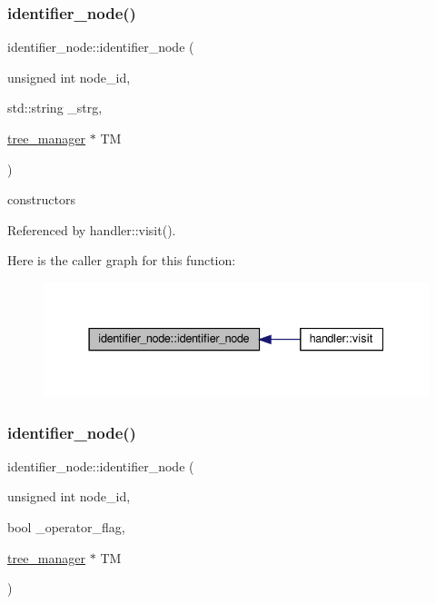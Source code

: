 \subsubsection{\texorpdfstring{identifier\+\_\+node()}{identifier\_node()}\hspace{0.1cm}{\footnotesize\ttfamily [1/2]}}
{\footnotesize\ttfamily identifier\+\_\+node\+::identifier\+\_\+node (\begin{DoxyParamCaption}\item[{unsigned int}]{node\+\_\+id,  }\item[{std\+::string}]{\+\_\+strg,  }\item[{\hyperlink{classtree__manager}{tree\+\_\+manager} $\ast$}]{TM }\end{DoxyParamCaption})}



constructors 



Referenced by handler\+::visit().

Here is the caller graph for this function\+:
\nopagebreak
\begin{figure}[H]
\begin{center}
\leavevmode
\includegraphics[width=337pt]{df/d9e/structidentifier__node_a8e3b4af31cd20552bf425dcdd680baa3_icgraph}
\end{center}
\end{figure}
\mbox{\label{structidentifier__node_af553785f7955ed859280854c953cdd21}} 
\subsubsection{\texorpdfstring{identifier\+\_\+node()}{identifier\_node()}\hspace{0.1cm}{\footnotesize\ttfamily [2/2]}}
{\footnotesize\ttfamily identifier\+\_\+node\+::identifier\+\_\+node (\begin{DoxyParamCaption}\item[{unsigned int}]{node\+\_\+id,  }\item[{bool}]{\+\_\+operator\+\_\+flag,  }\item[{\hyperlink{classtree__manager}{tree\+\_\+manager} $\ast$}]{TM }\end{DoxyParamCaption})}



